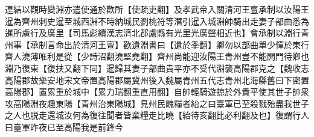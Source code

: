 連結以觀時變淵亦遣使通於歡所【使疏吏翻】及孝武帝入關清河王亶承制以汝陽王暹為齊州刺史暹至城西淵不時納城民劉桃符等潛引暹入城淵帥騎出走妻子部曲悉為暹所虜行及廣里【司馬彪續漢志濟北郡盧縣有光里光廣聲相近也】會承制以淵行青州事【承制言命出於清河王亶】歡遺淵書曰【遺於季翻】卿勿以部曲單少憚於東行齊人澆薄唯利是從【少詩沼翻澆堅堯翻】齊州尚能迎汝陽王青州豈不能開門待卿也淵乃復東【復扶又翻下同】暹歸其妻子部曲貴平亦不受代淵襲高陽郡克之【魏收志高陽郡故樂安地宋文帝置高陽郡屬冀州後入魏屬青州五代志青州北海縣舊曰下密置高陽郡】置累重於城中【累力瑞翻重直用翻】自帥輕騎遊掠於外貴平使其世子帥衆攻高陽淵夜趣東陽【青州治東陽城】見州民餽糧者紿之曰臺軍已至殺戮殆盡我世子之人也脱走還城汝何為復往聞者皆棄糧走比曉【紿待亥翻比必利翻及也】復謂行人曰臺軍昨夜已至高陽我是前鋒今